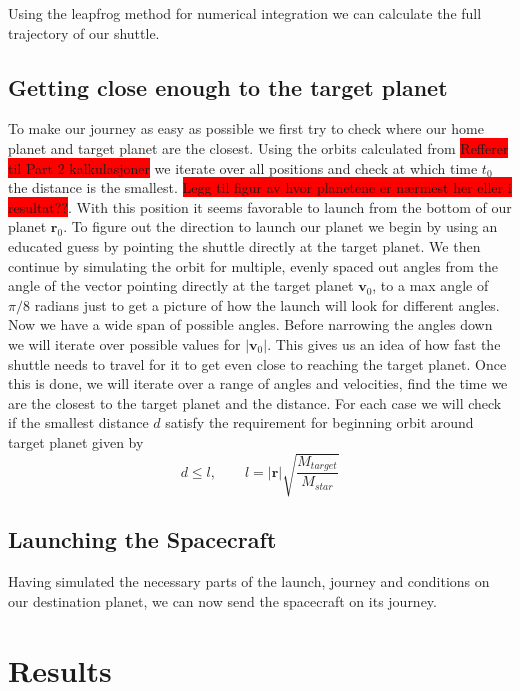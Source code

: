 \documentclass[reprint,english,notitlepage]{revtex4-2}
\begin{document}
Using the leapfrog method for numerical integration we can calculate the full trajectory of our shuttle.
\newline

\subsection{Getting close enough to the target planet}
To make our journey as easy as possible we first try to check where our home planet and target planet are the closest.
Using the orbits calculated from \colorbox{red}{Refferer til Part 2 kalkulasjoner} we iterate over all positions and check at which time $ t_{0} $ the distance is the smallest.
\colorbox{red}{Legg til figur av hvor planetene er nærmest her eller i resultat??}.
With this position it seems favorable to launch from the bottom of our planet $ \mathbf{r}_0 $.
To figure out the direction to launch our planet we begin by using an educated guess by pointing the shuttle directly at the target planet.
We then continue by simulating the orbit for multiple, evenly spaced out angles from the angle of the vector pointing directly at the target planet $ \mathbf{v}_0 $, to a max angle of $ \pi/8 $ radians just to get a picture of how the launch will look for different angles.
Now we have a wide span of possible angles.
Before narrowing the angles down we will iterate over possible values for $ \left\vert \mathbf{v}_0 \right\vert  $.
This gives us an idea of how fast the shuttle needs to travel for it to get even close to reaching the target planet.
Once this is done, we will iterate over a range of angles and velocities, find the time we are the closest to the target planet and the distance.
For each case we will check if the smallest distance $ d $ satisfy the requirement for beginning orbit around target planet given by
\[
d \le l, \qquad l = \left\vert \mathbf{r} \right\vert \sqrt{\frac{M_{target}}{M_{star}}}  
\]




\subsection{Launching the Spacecraft}\label{subsec:launching-the-spacecraft}
    Having simulated the necessary parts of the launch, journey and conditions on our destination planet, we can now send the spacecraft on its journey.


\section{Results} \label{sec: results}
\end{document}
